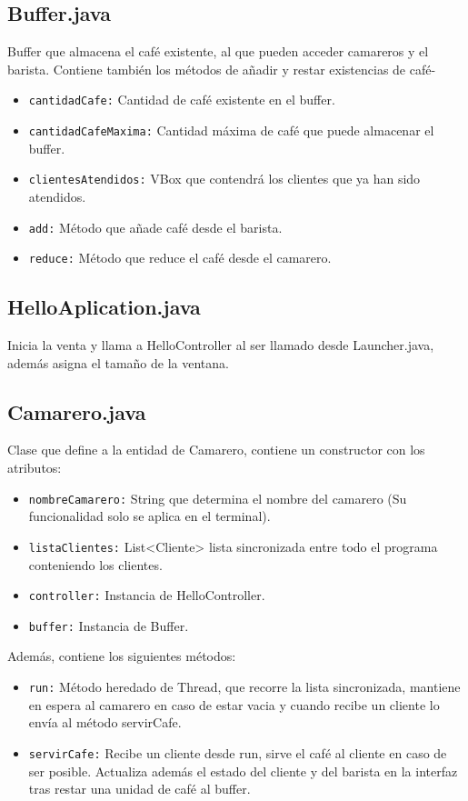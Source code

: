 \documentclass[a4paper,12pt]{article}
\begin{document}
    \subsection{Buffer.java}
        Buffer que almacena el café existente, al que pueden acceder camareros y el barista. Contiene también los métodos de añadir y restar existencias de café-
        \begin{itemize}
            \item \texttt{cantidadCafe:} Cantidad de café existente en el buffer.
            \item \texttt{cantidadCafeMaxima:} Cantidad máxima de café que puede almacenar el buffer.
            \item \texttt{clientesAtendidos:} VBox que contendrá los clientes que ya han sido atendidos.
            \vspace{0.3cm}
            \item \texttt{add:} Método que añade café desde el barista.
            \item \texttt{reduce:} Método que reduce el café desde el camarero.
        \end{itemize}
    \subsection{HelloAplication.java}
    Inicia la venta y llama a HelloController al ser llamado desde Launcher.java, además asigna el tamaño de la ventana.
    \subsection{Camarero.java}
    Clase que define a la entidad de Camarero, contiene un constructor con los atributos:
    \begin{itemize}
        \item \texttt{nombreCamarero:} String que determina el nombre del camarero (Su funcionalidad solo se aplica en el terminal).
        \item \texttt{listaClientes:} List<Cliente> lista sincronizada entre todo el programa conteniendo los clientes.
        \item \texttt{controller:} Instancia de HelloController.
        \item \texttt{buffer:} Instancia de Buffer.

    \end{itemize}
    Además, contiene los siguientes métodos:
    \begin{itemize}
        \item \texttt{run:} Método heredado de Thread, que recorre la lista sincronizada, mantiene en espera al camarero en caso de estar vacia
        y cuando recibe un cliente lo envía al método servirCafe.
        \item \texttt{servirCafe:} Recibe un cliente desde run, sirve el café al cliente en caso de ser posible. Actualiza además el estado del cliente y del barista 
        en la interfaz tras restar una unidad de café al buffer.
    \end{itemize}
\end{document}
